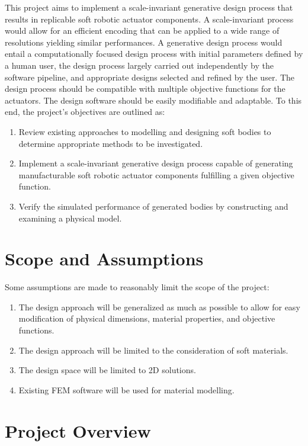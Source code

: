 This project aims to implement a scale-invariant generative design process that results in replicable soft robotic actuator components. A scale-invariant process would allow for an efficient encoding that can be applied to a wide range of resolutions yielding similar performances. A generative design process would entail a computationally focused design process with initial parameters defined by a human user, the design process largely carried out independently by the software pipeline, and appropriate designs selected and refined by the user. The design process should be compatible with multiple objective functions for the actuators. The design software should be easily modifiable and adaptable. To this end, the project's objectives are outlined as:

\begin{enumerate}
	\item Review existing approaches to modelling and designing soft bodies to determine appropriate methods to be investigated.
	\item Implement a scale-invariant generative design process capable of generating manufacturable soft robotic actuator components fulfilling a given objective function.
	\item Verify the simulated performance of generated bodies by constructing and examining a physical model.
\end{enumerate}

\section{Scope and Assumptions}
\label{sec:SaA}

Some assumptions are made to reasonably limit the scope of the project:

\begin{enumerate}
	\item The design approach will be generalized as much as possible to allow for easy modification of physical dimensions, material properties, and objective functions.
	\item The design approach will be limited to the consideration of soft materials.
	\item The design space will be limited to 2D solutions.
	\item Existing FEM software will be used for material modelling.
\end{enumerate}

\section{Project Overview}

